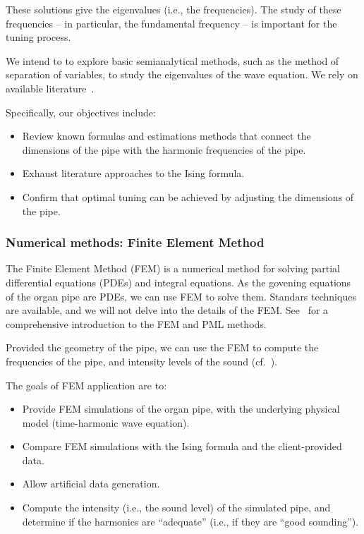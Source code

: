 \documentclass{psu-plan}
\begin{document}
These solutions give the eigenvalues (i.e., the frequencies). 
The study of these frequencies -- in particular, the fundamental
frequency -- is important for the tuning process.

We intend to to explore basic semianalytical methods, such as the method of
separation of variables, to study the eigenvalues of the wave equation.
We rely on available literature~\autocite{2004RosFle-1, 2012RosFle-1}.

Specifically, our objectives include:
\begin{itemize}
    \item Review known formulas and estimations methods that connect the
        dimensions of the pipe with the harmonic frequencies of the pipe.
    \item Exhaust literature approaches to the Ising formula.
    \item Confirm that optimal tuning can be achieved by adjusting the
        dimensions of the pipe.
\end{itemize}

\subsubsection{Numerical methods: Finite Element Method}

The Finite Element Method (FEM) is a numerical method for solving partial
differential equations (PDEs) and integral equations.
As the govening equations of the organ pipe are PDEs, we can use FEM to solve
them.
Standars techniques are available, and we will not delve into the details of the
FEM.
See~\autocite{2021ErnGue-1, 2021ErnGue-2, 2019VazKeeDem-1} for a
comprehensive introduction to the FEM and PML methods.

Provided the geometry of the pipe, we can use the FEM to compute the frequencies
of the pipe, and intensity levels of the sound
(cf.~\autocite[Figure 1]{2009RucAugFia-1}).

The goals of FEM application are to:
\begin{itemize}
    \item Provide FEM simulations of the organ pipe, with the underlying
        physical model (time-harmonic wave equation).
    \item Compare FEM simulations with the Ising formula and the client-provided data.
    \item Allow artificial data generation.
    \item Compute the intensity (i.e., the sound level) of the simulated pipe,
        and determine if the harmonics are ``adequate'' (i.e., if they are
        ``good sounding'').
\end{itemize}
\end{document}
